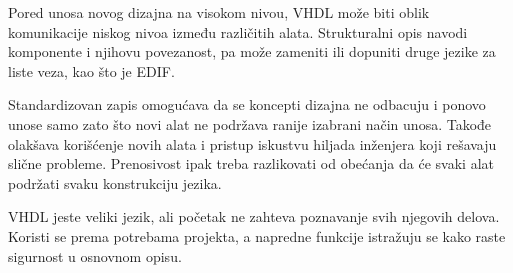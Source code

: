 Pored unosa novog dizajna na visokom nivou, VHDL može biti oblik komunikacije niskog nivoa između različitih alata. Strukturalni opis navodi komponente i njihovu povezanost, pa može zameniti ili dopuniti druge jezike za liste veza, kao što je EDIF.

Standardizovan zapis omogućava da se koncepti dizajna ne odbacuju i ponovo unose samo zato što novi alat ne podržava ranije izabrani način unosa. Takođe olakšava korišćenje novih alata i pristup iskustvu hiljada inženjera koji rešavaju slične probleme. Prenosivost ipak treba razlikovati od obećanja da će svaki alat podržati svaku konstrukciju jezika.

VHDL jeste veliki jezik, ali početak ne zahteva poznavanje svih njegovih delova. Koristi se prema potrebama projekta, a napredne funkcije istražuju se kako raste sigurnost u osnovnom opisu.

